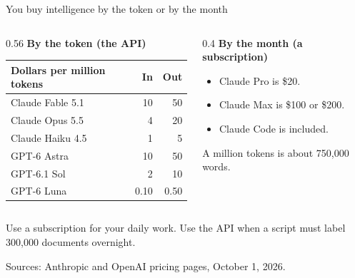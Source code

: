 \documentclass[aspectratio=169,11pt]{beamer}
\begin{document}
\begin{frame}{You buy intelligence by the token or by the month}

\begin{columns}[T]
\begin{column}{0.56\textwidth}
\textbf{By the token (the API)}

\vspace{0.1cm}
{\footnotesize
\begin{tabular}{@{}lrr@{}}
\toprule
Dollars per million tokens & In & Out \\
\midrule
Claude Fable 5.1 & 10 & 50 \\
Claude Opus 5.5 & 4 & 20 \\
Claude Haiku 4.5 & 1 & 5 \\
GPT-6 Astra & 10 & 50 \\
GPT-6.1 Sol & 2 & 10 \\
GPT-6 Luna & 0.10 & 0.50 \\
\bottomrule
\end{tabular}}
\end{column}
\begin{column}{0.4\textwidth}
\textbf{By the month (a subscription)}
\begin{itemize}\setlength\itemsep{0.25em}
    \item Claude Pro is \$20.
    \item Claude Max is \$100 or \$200.
    \item Claude Code is included.
\end{itemize}

\vspace{0.2cm}
A million tokens is about 750,000 words.
\end{column}
\end{columns}

\vspace{0.3cm}

\alert{Use a subscription for your daily work. Use the API when a script must label 300,000 documents overnight.}

\vspace{0.1cm}
{\scriptsize\color{warmgray}Sources: Anthropic and OpenAI pricing pages, October 1, 2026.}

\end{frame}

\end{document}
